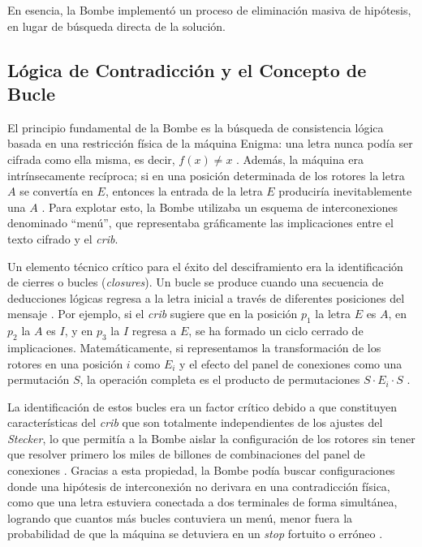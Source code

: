 En esencia, la Bombe implementó un proceso de eliminación masiva de hipótesis, en lugar de búsqueda directa de la solución.

\subsection{Lógica de Contradicción y el Concepto de Bucle}

El principio fundamental de la Bombe es la búsqueda de consistencia lógica basada en una restricción física de la máquina Enigma: una letra nunca podía ser cifrada como ella misma, es decir, $f(x) \neq x$ \cite{lahoz2012turing, copeland2006colossus}. Además, la máquina era intrínsecamente recíproca; si en una posición determinada de los rotores la letra $A$ se convertía en $E$, entonces la entrada de la letra $E$ produciría inevitablemente una $A$ \cite{copeland2006colossus}. Para explotar esto, la Bombe utilizaba un esquema de interconexiones denominado ``menú'', que representaba gráficamente las implicaciones entre el texto cifrado y el \textit{crib}.

Un elemento técnico crítico para el éxito del desciframiento era la identificación de cierres o bucles (\textit{closures}). Un bucle se produce cuando una secuencia de deducciones lógicas regresa a la letra inicial a través de diferentes posiciones del mensaje \cite{copeland2004essential, lahoz2012turing}. Por ejemplo, si el \textit{crib} sugiere que en la posición $p_1$ la letra $E$ es $A$, en $p_2$ la $A$ es $I$, y en $p_3$ la $I$ regresa a $E$, se ha formado un ciclo cerrado de implicaciones. Matemáticamente, si representamos la transformación de los rotores en una posición $i$ como $E_i$ y el efecto del panel de conexiones como una permutación $S$, la operación completa es el producto de permutaciones $S \cdot E_i \cdot S$ \cite{copeland2004essential}. 

La identificación de estos bucles era un factor crítico debido a que constituyen características del \textit{crib} que son totalmente independientes de los ajustes del \textit{Stecker}, lo que permitía a la Bombe aislar la configuración de los rotores sin tener que resolver primero los miles de billones de combinaciones del panel de conexiones \cite{copeland2004essential, hodges2014turing}. Gracias a esta propiedad, la Bombe podía buscar configuraciones donde una hipótesis de interconexión no derivara en una contradicción física, como que una letra estuviera conectada a dos terminales de forma simultánea, logrando que cuantos más bucles contuviera un menú, menor fuera la probabilidad de que la máquina se detuviera en un \textit{stop} fortuito o erróneo \cite{hodges2014turing, lahoz2012turing}.

